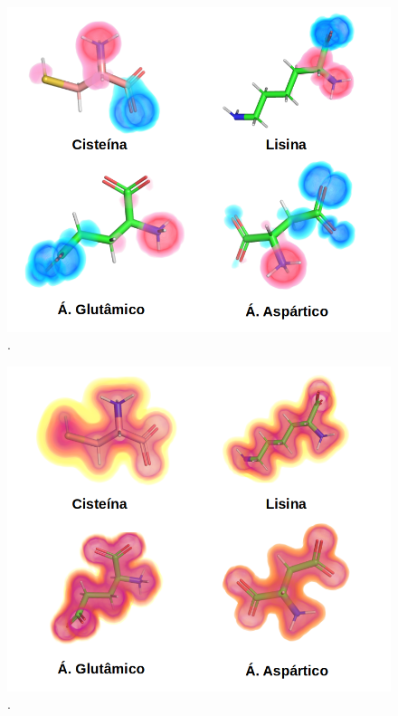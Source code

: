 \documentclass[a4paper,11pt]{refart}
\begin{document}
\hspace*{-\leftmarginwidth}
\begin{minipage}{\fullwidth}
	\begin{figure}[H]
		\begin{center}
			\includegraphics[width=5in]{images/tut4_img15}
			\caption{.}
			\label{fig_tut4_13}
		\end{center}
	\end{figure}
\end{minipage}

\hspace*{-\leftmarginwidth}
\begin{minipage}{\fullwidth}
	\begin{figure}[H]
		\begin{center}
			\includegraphics[width=5in]{images/tut4_img16}
			\caption{.}
			\label{fig_tut4_14}
		\end{center}
	\end{figure}
\end{minipage}
\end{document}
